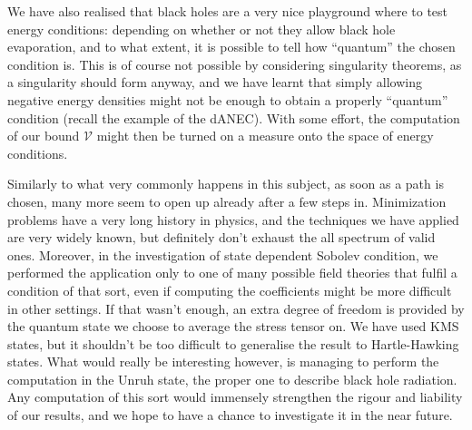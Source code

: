 We have also realised that black holes are a very nice playground where to test energy conditions: depending on whether or not they allow black hole evaporation, and to what extent, it is possible to tell how ``quantum'' the chosen condition is. This is of course not possible by considering singularity theorems, as a singularity should form anyway, and we have learnt that simply allowing negative energy densities might not be enough to obtain a properly ``quantum'' condition (recall the example of the dANEC). With some effort, the computation of our bound \(\mathcal{V}\) might then be turned on a measure onto the space of energy conditions.

Similarly to what very commonly happens in this subject, as soon as a path is chosen, many more seem to open up already after a few steps in.
Minimization problems have a very long history in physics, and the techniques we have applied are very widely known, but definitely don't exhaust the all spectrum of valid ones.
Moreover, in the investigation of state dependent Sobolev condition, we performed the application only to one of many possible field theories that fulfil a condition of that sort, even if computing the coefficients might be more difficult in other settings.
If that wasn't enough, an extra degree of freedom is provided by the quantum state we choose to average the stress tensor on. We have used KMS states, but it shouldn't be too difficult to generalise the result to Hartle-Hawking states.
What would really be interesting however, is managing to perform the computation in the Unruh state, the proper one to describe black hole radiation. Any computation of this sort would immensely strengthen the rigour and liability of our results, and we hope to have a chance to investigate it in the near future.

